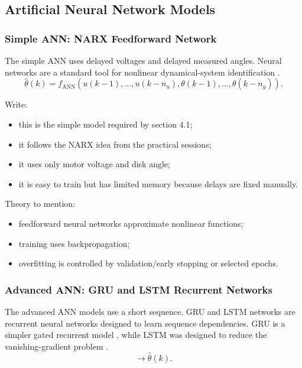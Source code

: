 \documentclass[conference]{IEEEtran}
\begin{document}
\subsection{Artificial Neural Network Models}

\subsubsection{Simple ANN: NARX Feedforward Network}
The simple ANN uses delayed voltages and delayed measured angles.
Neural networks are a standard tool for nonlinear dynamical-system identification \cite{narendra1990identification}.
\begin{equation}
\hat{\theta}(k) =
f_{\mathrm{ANN}}(u(k-1), \ldots, u(k-n_u),
\theta(k-1), \ldots, \theta(k-n_y)).
\end{equation}

Write:
\begin{itemize}
    \item this is the simple model required by section 4.1;
    \item it follows the NARX idea from the practical sessions;
    \item it uses only motor voltage and disk angle;
    \item it is easy to train but has limited memory because delays are fixed manually.
\end{itemize}

Theory to mention:
\begin{itemize}
    \item feedforward neural networks approximate nonlinear functions;
    \item training uses backpropagation;
    \item overfitting is controlled by validation/early stopping or selected epochs.
\end{itemize}

\subsubsection{Advanced ANN: GRU and LSTM Recurrent Networks}
The advanced ANN models use a short sequence.
GRU and LSTM networks are recurrent neural networks designed to learn sequence dependencies.
GRU is a simpler gated recurrent model \cite{cho2014gru}, while LSTM was designed to reduce the vanishing-gradient problem \cite{hochreiter1997lstm}.
\begin{equation}
[(u(k-H),\theta(k-H)), \ldots, (u(k-1),\theta(k-1))]
\rightarrow \hat{\theta}(k).
\end{equation}
\end{document}
